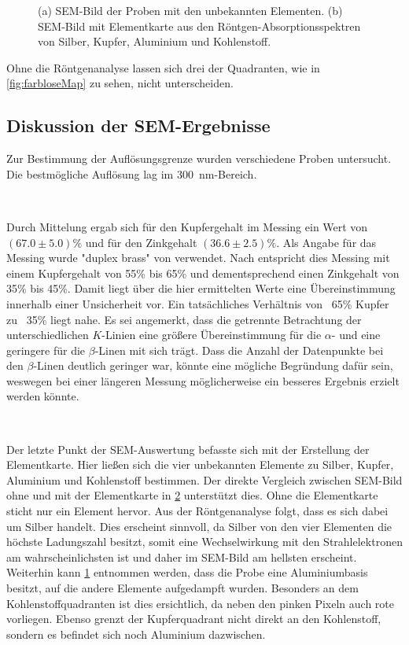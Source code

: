 \begin{figure}[H]
\begin{subfigure}[c]{.45\textwidth}
			\subcaption{}
			\label{fig:bunteMap}
		\end{subfigure}
		\caption{(a) SEM-Bild der Proben mit den unbekannten Elementen.
		(b) SEM-Bild mit Elementkarte aus den Röntgen-Absorptionsspektren von Silber, Kupfer, Aluminium und Kohlenstoff.}
		\label{fig:elementalMap}
	\end{figure}
	Ohne die Röntgenanalyse lassen sich drei der Quadranten, wie in \cref{fig:farbloseMap} zu sehen, nicht unterscheiden.

\subsection{Diskussion der SEM-Ergebnisse}

	Zur Bestimmung der Auflösungsgrenze wurden verschiedene Proben untersucht.
	Die bestmögliche Auflösung lag im \SI{300}{\nano\meter}-Bereich.

	\

	Durch Mittelung ergab sich für den Kupfergehalt im Messing ein Wert von $(67.0\pm5.0)\%$ und für den Zinkgehalt $(36.6\pm2.5)\%$.
	Als Angabe für das Messing wurde "duplex brass" von \cite{wwu} verwendet.
	Nach \cite{wikiMs} entspricht dies Messing mit einem Kupfergehalt von 55\% bis 65\% und dementsprechend einen Zinkgehalt von 35\% bis 45\%.
	Damit liegt über die hier ermittelten Werte eine Übereinstimmung innerhalb einer Unsicherheit vor.
	Ein tatsächliches Verhältnis von ~65\% Kupfer zu ~35\% liegt nahe.
	Es sei angemerkt, dass die getrennte Betrachtung der unterschiedlichen $K$-Linien eine größere Übereinstimmung für die $\alpha$- und eine geringere für die $\beta$-Linen mit sich trägt.
	Dass die Anzahl der Datenpunkte bei den $\beta$-Linen deutlich geringer war, könnte eine mögliche Begründung dafür sein, weswegen bei einer längeren Messung möglicherweise ein besseres Ergebnis erzielt werden könnte.

	\

	Der letzte Punkt der SEM-Auswertung befasste sich mit der Erstellung der Elementkarte.
	Hier ließen sich die vier unbekannten Elemente zu Silber, Kupfer, Aluminium und Kohlenstoff bestimmen.
	Der direkte Vergleich zwischen SEM-Bild ohne und mit der Elementkarte in \cref{fig:elementalMap} unterstützt dies.
	Ohne die Elementkarte sticht nur ein Element hervor.
	Aus der Röntgenanalyse folgt, dass es sich dabei um Silber handelt.
	Dies erscheint sinnvoll, da Silber von den vier Elementen die höchste Ladungszahl besitzt, somit eine Wechselwirkung mit den Strahlelektronen am wahrscheinlichsten ist und daher im SEM-Bild am hellsten erscheint.
	Weiterhin kann \cref{fig:bunteMap} entnommen werden, dass die Probe eine Aluminiumbasis besitzt, auf die andere Elemente aufgedampft wurden.
	Besonders an dem Kohlenstoffquadranten ist dies ersichtlich, da neben den pinken Pixeln auch rote vorliegen.
	Ebenso grenzt der Kupferquadrant nicht direkt an den Kohlenstoff, sondern es befindet sich noch Aluminium dazwischen.
